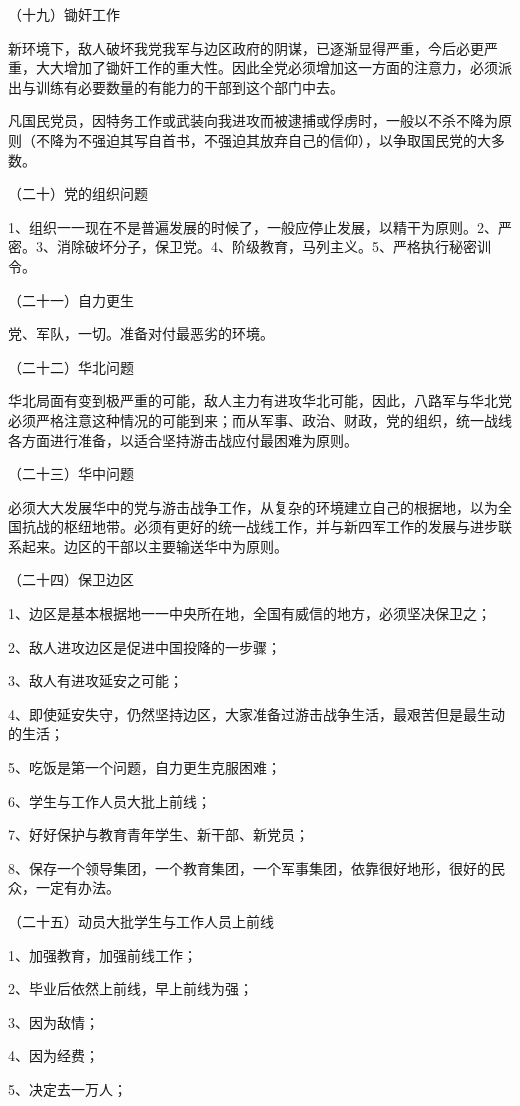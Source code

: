 （十九）锄奸工作

新环境下，敌人破坏我党我军与边区政府的阴谋，已逐渐显得严重，今后必更严重，大大增加了锄奸工作的重大性。因此全党必须增加这一方面的注意力，必须派出与训练有必要数量的有能力的干部到这个部门中去。

凡国民党员，因特务工作或武装向我进攻而被逮捕或俘虏时，一般以不杀不降为原则（不降为不强迫其写自首书，不强迫其放弃自己的信仰），以争取国民党的大多数。

（二十）党的组织问题

1、组织一一现在不是普遍发展的时候了，一般应停止发展，以精干为原则。2、严密。3、消除破坏分子，保卫党。4、阶级教育，马列主义。5、严格执行秘密训令。

（二十一）自力更生

党、军队，一切。准备对付最恶劣的环境。

（二十二）华北问题

华北局面有变到极严重的可能，敌人主力有进攻华北可能，因此，八路军与华北党必须严格注意这种情况的可能到来；而从军事、政治、财政，党的组织，统一战线各方面进行准备，以适合坚持游击战应付最困难为原则。

（二十三）华中问题

必须大大发展华中的党与游击战争工作，从复杂的环境建立自己的根据地，以为全国抗战的枢纽地带。必须有更好的统一战线工作，并与新四军工作的发展与进步联系起来。边区的干部以主要输送华中为原则。

（二十四）保卫边区

1、边区是基本根据地一一中央所在地，全国有威信的地方，必须坚决保卫之；

2、敌人进攻边区是促进中国投降的一步骤；

3、敌人有进攻延安之可能；

4、即使延安失守，仍然坚持边区，大家准备过游击战争生活，最艰苦但是最生动的生活；

5、吃饭是第一个问题，自力更生克服困难；

6、学生与工作人员大批上前线；

7、好好保护与教育青年学生、新干部、新党员；

8、保存一个领导集团，一个教育集团，一个军事集团，依靠很好地形，很好的民众，一定有办法。

（二十五）动员大批学生与工作人员上前线

1、加强教育，加强前线工作；

2、毕业后依然上前线，早上前线为强；

3、因为敌情；

4、因为经费；

5、决定去一万人；

